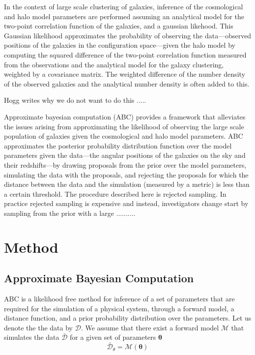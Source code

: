 \documentclass[12pt, preprint]{aastex}
\newcommand{\beq}{\begin{equation}}
\newcommand{\eeq}{\end{equation}}
\begin{document}
In the context of large scale clustering of galaxies, inference of the cosmological and halo model parameters are performed assuming 
an analytical model for the two-point correlation function of the galaxies, and a gaussian likehood. This Gaussian likelihood approximates 
the probability of observing the data---observed positions of the galaxies in the configuration space---given the halo model by computing 
the squared difference of the two-point correlation function measured from the observations and the analytical model for the galaxy 
clustering, weighted by a covariance matrix. The weighted difference of the number density of the observed galaxies and the analytical 
number density is often added to this. 

Hogg writes why we do not want to do this .....


Approximate bayesian computation (ABC) provides a framework that alleviates the issues arising from approximating the likelihood of 
observing the large scale population of galaxies given the cosmological and halo model parameters. ABC approximates the posterior 
probability distribution function over the model parameters given the data---the angular positions of the galaxies on the sky and 
their redshifts---by drawing proposals from the prior over the model parameters, simulating the data with the proposals, and rejecting 
the proposals for which the distance between the data and the simulation (measured by a metric) is less than a certain threshold. The 
procedure described here is rejected sampling. In practice rejected sampling is expensive and instead, investigators change start 
by sampling from the prior with a large ..........



\section{Method}

\subsection{Approximate Bayesian Computation}

ABC is a likelihood free method for inference of a set of parameters that are required for the simulation of a 
physical system, through a forward model, a distance function, and a prior probability distribution over the parameters. 
Let us denote the the data by $\mathcal{D}$. We assume that there exist a forward model $\mathcal{M}$ that 
simulates the data $\bar{\mathcal{D}}$ for a given set of parameters $\bm{\theta}$
\beq
\bar{\mathcal{D}}_{\theta} = \mathcal{M}(\bm{\theta})
\eeq
\end{document}
